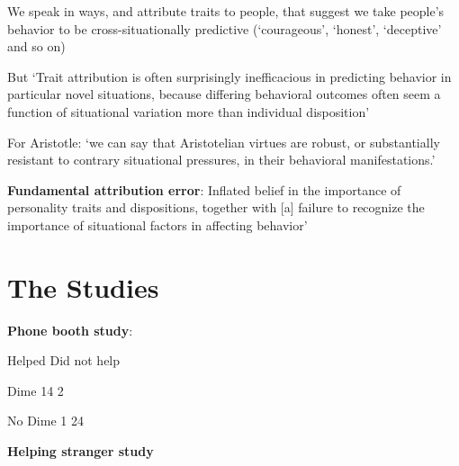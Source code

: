 \documentclass[11pt]{article}
\begin{document}
\noindent We speak in ways, and attribute traits to people, that suggest we take people's behavior to be cross-situationally predictive (`courageous', `honest', `deceptive' and so on)
\vspace*{2mm}

\noindent But `Trait attribution is often surprisingly inefficacious in predicting behavior in particular novel situations, because differing behavioral outcomes often seem a function of situational variation more than individual disposition'
\vspace*{2mm}

\noindent For Aristotle: `we can say that Aristotelian virtues are robust, or substantially resistant to contrary situational pressures, in their behavioral manifestations.'
\vspace*{2mm}

\noindent\textbf{Fundamental attribution error}: Inflated belief in the importance of personality traits and dispositions, together with [a] failure to recognize the importance of situational factors in affecting behavior'
\vspace*{2mm}

\section{The Studies}

\noindent\textbf{Phone booth study}:
\vspace*{2mm}

\hspace*{17mm} Helped\hspace*{5mm} Did not help

Dime\hspace*{10mm} 14\hspace*{17mm} 2

No Dime\hspace*{5.5mm} 1\hspace*{17mm} 24
\vspace*{5mm}

\noindent\textbf{Helping stranger study}
\vspace*{4mm}
\end{document}
